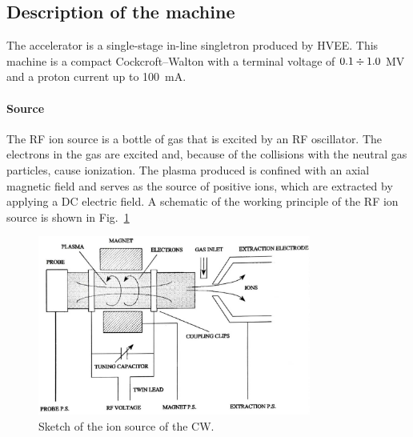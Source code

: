 \begin{refsection}
    \subsection{Description of the machine}
        \label{sec:cw:machine}
        The accelerator is a single-stage in-line singletron produced by HVEE. 
        This machine is a compact Cockcroft–Walton with a terminal voltage of $0.1\divisionsymbol1.0$ MV and a proton current up to \SI{100}{mA}.
        
        \paragraph{Source} The RF ion source is a bottle of gas that is excited by an RF oscillator. 
        The electrons in the gas are excited and, because of the collisions with the neutral gas particles, cause ionization.
        The plasma produced is confined with an axial magnetic field and serves as the source of positive ions, which are extracted by applying a DC electric field.
        A schematic of the working principle of the RF ion source is shown in Fig.~\ref{fig:CW:sketch:ionsource}

       \begin{figure}
            \centering
            \includegraphics[width=0.8\textwidth]{Figures/MEG/CW/cw_ionsource.jpeg}
            \caption{Sketch of the ion source of the CW.}
            \label{fig:CW:sketch:ionsource}
        \end{figure}
        

\end{refsection}
